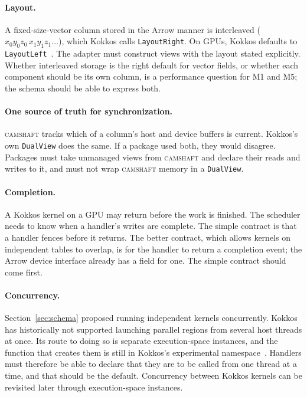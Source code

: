 \documentclass[11pt,a4paper]{article}
\newcommand{\camshaft}{\textsc{camshaft}}
\newcommand{\code}[1]{\texttt{#1}}
\begin{document}
\paragraph{Layout.}  A fixed-size-vector column stored in the Arrow manner is
interleaved ($x_0 y_0 z_0\, x_1 y_1 z_1 \ldots$), which Kokkos calls
\code{LayoutRight}.  On GPUs, Kokkos defaults to
\code{LayoutLeft}~\cite{kokkosdocs}.  The
adapter must construct views with the layout stated explicitly.  Whether
interleaved storage is the right default for vector fields, or whether each
component should be its own column, is a performance question for M1 and M5;
the schema should be able to express both.

\paragraph{One source of truth for synchronization.}  \camshaft{} tracks which of
a column's host and device buffers is current.  Kokkos's own
\code{DualView} does the same.  If a package used both, they would disagree.
Packages must take unmanaged views from \camshaft{} and declare their reads and
writes to it, and must not wrap \camshaft{} memory in a \code{DualView}.

\paragraph{Completion.}  A Kokkos kernel on a GPU may return before the work
is finished.  The scheduler needs to know when a handler's writes are
complete.  The simple contract is that a handler fences before it returns.
The better contract, which allows kernels on independent tables to overlap,
is for the handler to return a completion event; the Arrow device interface
already has a field for one.  The simple contract should come first.

\paragraph{Concurrency.}  Section~\ref{sec:schema} proposed running
independent kernels concurrently.  Kokkos has historically not supported
launching parallel regions from several host threads at once.  Its route to
doing so is separate execution-space instances, and the function that
creates them is still in Kokkos's experimental
namespace~\cite{kokkosdocs}.  Handlers must
therefore be able to declare that they are to be called from one thread at a
time, and that should be the default.  Concurrency between Kokkos kernels can
be revisited later through execution-space instances.
\end{document}
